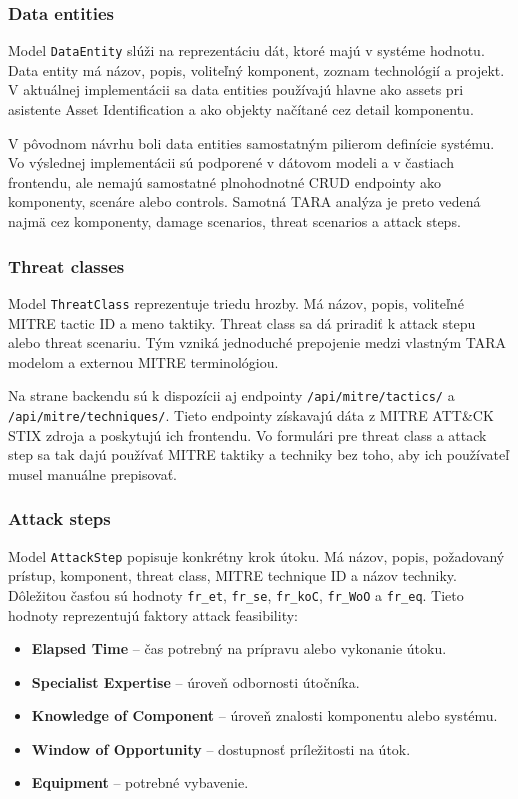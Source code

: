 \documentclass[11pt]{article}
\begin{document}
\subsubsection{Data entities}

Model \texttt{DataEntity} slúži na reprezentáciu dát, ktoré majú v systéme hodnotu. Data entity má názov, popis, voliteľný komponent, zoznam technológií a projekt. V aktuálnej implementácii sa data entities používajú hlavne ako assets pri asistente Asset Identification a ako objekty načítané cez detail komponentu.

V pôvodnom návrhu boli data entities samostatným pilierom definície systému. Vo výslednej implementácii sú podporené v dátovom modeli a v častiach frontendu, ale nemajú samostatné plnohodnotné CRUD endpointy ako komponenty, scenáre alebo controls. Samotná TARA analýza je preto vedená najmä cez komponenty, damage scenarios, threat scenarios a attack steps.

\subsubsection{Threat classes}

Model \texttt{ThreatClass} reprezentuje triedu hrozby. Má názov, popis, voliteľné MITRE tactic ID a meno taktiky. Threat class sa dá priradiť k attack stepu alebo threat scenariu. Tým vzniká jednoduché prepojenie medzi vlastným TARA modelom a externou MITRE terminológiou.

Na strane backendu sú k dispozícii aj endpointy \texttt{/api/mitre/tactics/} a \texttt{/api/mitre/techniques/}. Tieto endpointy získavajú dáta z MITRE ATT\&CK STIX zdroja a poskytujú ich frontendu. Vo formulári pre threat class a attack step sa tak dajú používať MITRE taktiky a techniky bez toho, aby ich používateľ musel manuálne prepisovať.

\subsubsection{Attack steps}

Model \texttt{AttackStep} popisuje konkrétny krok útoku. Má názov, popis, požadovaný prístup, komponent, threat class, MITRE technique ID a názov techniky. Dôležitou časťou sú hodnoty \texttt{fr\_et}, \texttt{fr\_se}, \texttt{fr\_koC}, \texttt{fr\_WoO} a \texttt{fr\_eq}. Tieto hodnoty reprezentujú faktory attack feasibility:

\begin{itemize}
    \item \textbf{Elapsed Time} -- čas potrebný na prípravu alebo vykonanie útoku.
    \item \textbf{Specialist Expertise} -- úroveň odbornosti útočníka.
    \item \textbf{Knowledge of Component} -- úroveň znalosti komponentu alebo systému.
    \item \textbf{Window of Opportunity} -- dostupnosť príležitosti na útok.
    \item \textbf{Equipment} -- potrebné vybavenie.
\end{itemize}
\end{document}
